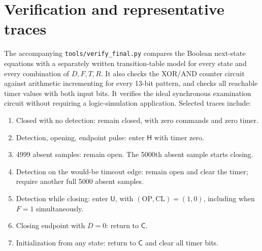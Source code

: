 \section{Verification and representative traces}
The accompanying \texttt{tools/verify\_final.py} compares the Boolean
next-state equations with a separately written transition-table model
for every state and every combination of \(D,F,T,R\). It also checks
the XOR/AND counter circuit against arithmetic incrementing for every
13-bit pattern, and checks all reachable timer values with both input
bits. It verifies the ideal synchronous examination circuit without
requiring a logic-simulation application. Selected traces include:
\begin{enumerate}[itemsep=2pt,topsep=3pt]
\item Closed with no detection: remain closed, with zero commands and
zero timer.
\item Detection, opening, endpoint pulse: enter \(\mathsf H\) with
timer zero.
\item 4999 absent samples: remain open. The 5000th absent sample starts
closing.
\item Detection on the would-be timeout edge: remain open and clear the
timer; require another full 5000 absent samples.
\item Detection while closing: enter \(\mathsf U\), with
\((\mathrm{OP},\mathrm{CL})=(1,0)\), including when \(F=1\) simultaneously.
\item Closing endpoint with \(D=0\): return to \(\mathsf C\).
\item Initialization from any state: return to \(\mathsf C\) and clear
all timer bits.
\end{enumerate}

